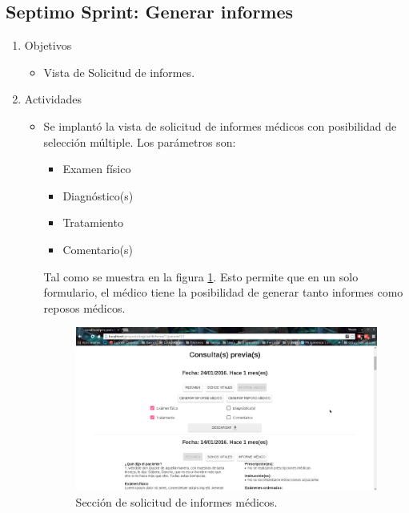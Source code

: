     \subsection{Septimo Sprint: Generar informes}
    \begin{enumerate}
        \item Objetivos
        \begin{itemize}
            \item Vista de Solicitud de informes.
        \end{itemize}
        \item Actividades
        \begin{itemize}
            \item Se implantó la vista de solicitud de informes médicos con posibilidad de selección múltiple. Los parámetros son:
            \begin{itemize}
                \item Examen físico
                \item Diagnóstico(s)
                \item Tratamiento
                \item Comentario(s)
            \end{itemize}
            
            Tal como se muestra en la figura \ref{solicitudInforme}. Esto permite que en un solo formulario, el médico tiene la posibilidad de generar tanto informes como reposos médicos.
            
            \begin{figure}[htbp!]
                \begin{center}
                    \includegraphics[width=.8\textwidth]{figures/p23}
                \end{center}
                \caption{Sección de solicitud de informes médicos.}
                \label{solicitudInforme}
            \end{figure}
        \end{itemize}
    \end{enumerate}
        
